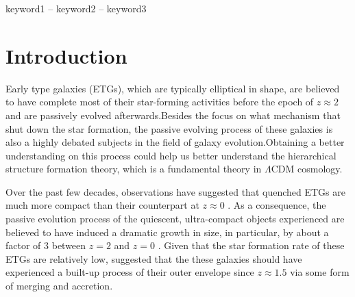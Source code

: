 \documentclass[fleqn,usenatbib]{mnras}
\begin{document}
\begin{keywords}
keyword1 -- keyword2 -- keyword3
\end{keywords}



\section{Introduction}
\label{sec:intro}
\par Early type galaxies (ETGs), which are typically elliptical in shape, are believed to have complete most of their star-forming activities before the epoch of $z \approx 2$ and are passively evolved afterwards.Besides the focus on what mechanism that shut down the star formation, the passive evolving process of these galaxies is also a highly debated subjects in the field of galaxy evolution.Obtaining a better understanding on this process could help us better understand the hierarchical structure formation theory, which is a fundamental theory in $\Lambda$CDM cosmology.
\par  Over the past few decades, observations have suggested that quenched ETGs are much more compact than their counterpart at $z \approx 0$ \citep{daddiPassivelyEvolvingEarlyType2005, toft2007, trujillo2006, trujillo2007, vandokkum2008}. As a consequence, the passive evolution process of the quiescent, ultra-compact objects experienced are believed to have induced a dramatic growth in size, in particular, by about a factor of 3 between $z = 2$ and $z = 0$ \citep{damjanov2019, fan_dramatic_2008, hamadouche2022, vanderwel3DHSTCANDELSEvolution2014, van_dokkum_growth_2010}.
Given that the star formation rate of these ETGs are relatively low, \cite{van_dokkum_growth_2010} suggested that the these galaxies should have experienced a built-up process of their outer envelope since $z \approx 1.5$ via some form of merging and accretion.
\end{document}
